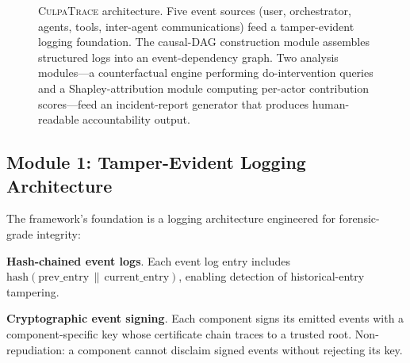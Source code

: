 \documentclass[sigconf,nonacm]{acmart}
\begin{document}
\begin{figure}[t]
\caption{\textsc{CulpaTrace} architecture. Five event sources (user,
  orchestrator, agents, tools, inter-agent communications) feed a
  tamper-evident logging foundation. The causal-DAG construction
  module assembles structured logs into an event-dependency graph.
  Two analysis modules---a counterfactual engine performing
  do-intervention queries and a Shapley-attribution module computing
  per-actor contribution scores---feed an incident-report
  generator that produces human-readable accountability output.}
\label{fig:framework}
\end{figure}

\subsection{Module 1: Tamper-Evident Logging Architecture}

The framework's foundation is a logging architecture engineered for
forensic-grade integrity:

\textbf{Hash-chained event logs}. Each event log entry includes
$\text{hash}(\text{prev\_entry} \, \| \, \text{current\_entry})$,
enabling detection of historical-entry tampering.

\textbf{Cryptographic event signing}. Each component signs its
emitted events with a component-specific key whose certificate
chain traces to a trusted root. Non-repudiation: a component
cannot disclaim signed events without rejecting its key.
\end{document}
